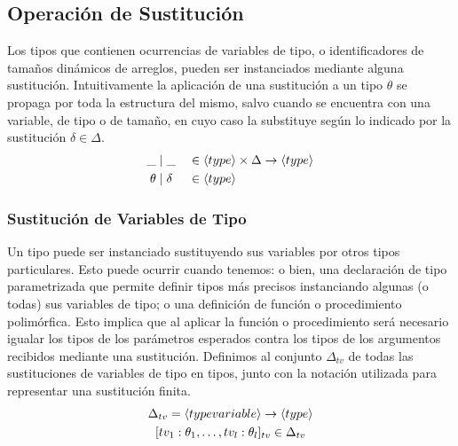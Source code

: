 \subsection{Operación de Sustitución}

Los tipos que contienen ocurrencias de variables de tipo, o identificadores de tamaños dinámicos de arreglos, pueden ser instanciados mediante alguna sustitución. %
Intuitivamente la aplicación de una sustitución a un tipo $\theta$ se propaga por toda la estructura del mismo, salvo cuando se encuentra con una variable, de tipo o de tamaño, en cuyo caso la substituye según lo indicado por la sustitución $\delta \in \Delta$.
\begin{alignat*}{2}
\_ &\mid \_
&&\in
\langle type \rangle \times \Delta \rightarrow \langle type \rangle
\\
\theta &\mid \delta
&&\in
\langle type \rangle
\end{alignat*}

\subsubsection{Sustitución de Variables de Tipo}

Un tipo puede ser instanciado sustituyendo sus variables por otros tipos particulares.
Esto puede ocurrir cuando tenemos: o bien, una declaración de tipo parametrizada que permite definir tipos más precisos instanciando algunas (o todas) sus variables de tipo;
o una definición de función o procedimiento polimórfica.
Esto implica que al aplicar la función o procedimiento será necesario igualar los tipos de los parámetros esperados contra los tipos de los argumentos recibidos mediante una sustitución.
Definimos al conjunto $\Delta_{tv}$ de todas las sustituciones de variables de tipo en tipos, junto con la notación utilizada para representar una sustitución finita.
\begin{gather*}
\Delta_{tv} = \langle typevariable \rangle \rightarrow \langle type \rangle
\\
[tv_1 : \theta_1, \ldots, tv_l : \theta_l]_{tv} \in \Delta_{tv}
\end{gather*}


